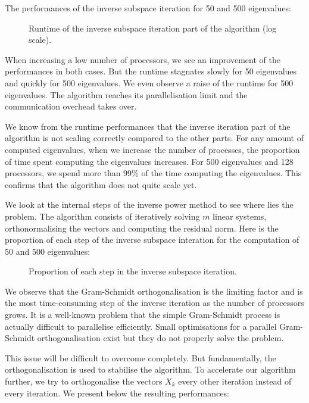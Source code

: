 The performances of the inverse subspace iteration for 50 and 500 eigenvalues:

\begin{figure}[H]
  \centering
  
  \caption{Runtime of the inverse subspace iteration part of the algorithm (log scale).}
\end{figure}

When increasing a low number of processors, we see an improvement of the performances in both cases.
But the runtime stagnates slowly for 50 eigenvalues and quickly for 500 eigenvalues.
We even observe a raise of the runtime for 500 eigenvalues.
The algorithm reaches its parallelisation limit and the communication overhead takes over.

We know from the runtime performances that the inverse iteration part of the algorithm is not scaling correctly compared to the other parts.
For any amount of computed eigenvalues, when we increase the number of processes, the proportion of time spent computing the eigenvalues increases.
For 500 eigenvalues and 128 processors, we spend more than 99\% of the time computing the eigenvalues.
This confirms that the algorithm does not quite scale yet.

We look at the internal steps of the inverse power method to see where lies the problem.
The algorithm consists of iteratively solving \(m\) linear systems, orthonormalising the vectors and computing the residual norm.
Here is the proportion of each step of the inverse subspace interation for the computation of 50 and 500 eigenvalues:

\begin{figure}[H]
  \centering
  
  \caption{Proportion of each step in the inverse subspace iteration.}
\end{figure}

We observe that the Gram-Schmidt orthogonalisation is the limiting factor and is the most time-consuming step of the inverse iteration as the number of processors grows.
It is a well-known problem that the simple Gram-Schmidt process is actually difficult to parallelise efficiently.
Small optimisations for a parallel Gram-Schmidt orthogonalisation exist \cite{katagiri_parallel_gram_schmidt_2003} but they do not properly solve the problem.

This issue will be difficult to overcome completely.
But fundamentally, the orthogonalisation is used to stabilise the algorithm.
To accelerate our algorithm further, we try to orthogonalise the vectors \(X_k\) every other iteration instead of every iteration.
We present below the resulting performances:

